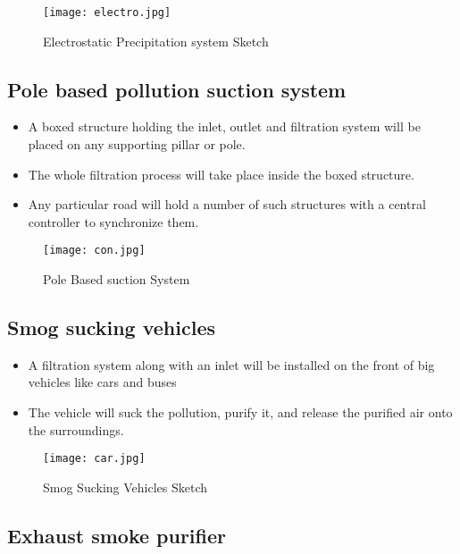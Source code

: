 \documentclass[12pt]{article}
\begin{document}
\begin{figure}[!htb]
\centering
\texttt{[image: electro.jpg]}
\caption{\label{fig:}Electrostatic Precipitation system Sketch}
\end{figure}

\newpage

\subsection{Pole based pollution suction system}

\begin{itemize}
\item A boxed structure holding the inlet, outlet and filtration system will be placed on any supporting pillar or pole.
\item The whole filtration process will take place inside the boxed structure.
\item Any particular road will hold a number of such structures with a central controller to synchronize them.
\end{itemize}

\begin{figure}[!htb]
\centering
\texttt{[image: con.jpg]}
\caption{\label{fig:}Pole Based suction System}
\end{figure}

\newpage

\subsection{Smog sucking vehicles}

\begin{itemize}
\item A filtration system along with an inlet will be installed on the front of big vehicles like cars and buses
\item The vehicle will suck the pollution, purify it, and release the purified air onto the surroundings.
\end{itemize}

\begin{figure}[!htb]
\centering
\texttt{[image: car.jpg]}
\caption{\label{fig:}Smog Sucking Vehicles Sketch}
\end{figure}

\subsection{Exhaust smoke purifier}
\end{document}
